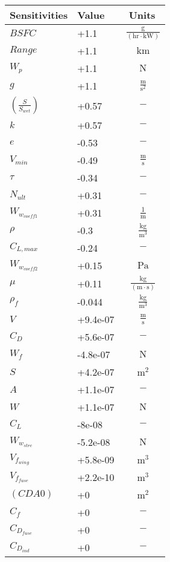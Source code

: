 {\footnotesize
\begin{longtable}{llc}
\toprule
Sensitivities & Value & Units \\ \midrule
$BSFC$ & +1.1  & $~\mathrm{\tfrac{g}{\left(hr\cdot kW\right)}}$ \\
$Range$ & +1.1  & $~\mathrm{km}$ \\
$W_p$ & +1.1  & $~\mathrm{N}$ \\
$g$ & +1.1  & $~\mathrm{\tfrac{m}{s^{2}}}$ \\
$(\frac{S}{S_{wet}})$ & +0.57  & $~\mathrm{-}$ \\
$k$ & +0.57  & $~\mathrm{-}$ \\
$e$ & -0.53  & $~\mathrm{-}$ \\
$V_{min}$ & -0.49  & $~\mathrm{\tfrac{m}{s}}$ \\
$\tau$ & -0.34  & $~\mathrm{-}$ \\
$N_{ult}$ & +0.31  & $~\mathrm{-}$ \\
$W_{w_{coeff1}}$ & +0.31  & $~\mathrm{\tfrac{1}{m}}$ \\
$\rho$ & -0.3  & $~\mathrm{\tfrac{kg}{m^{3}}}$ \\
$C_{L,max}$ & -0.24  & $~\mathrm{-}$ \\
$W_{w_{coeff2}}$ & +0.15  & $~\mathrm{Pa}$ \\
$\mu$ & +0.11  & $~\mathrm{\tfrac{kg}{\left(m\cdot s\right)}}$ \\
$\rho_f$ & -0.044  & $~\mathrm{\tfrac{kg}{m^{3}}}$ \\
$V$ & +9.4e-07  & $~\mathrm{\tfrac{m}{s}}$ \\
$C_D$ & +5.6e-07  & $~\mathrm{-}$ \\
$W_f$ & -4.8e-07  & $~\mathrm{N}$ \\
$S$ & +4.2e-07  & $~\mathrm{m^{2}}$ \\
$A$ & +1.1e-07  & $~\mathrm{-}$ \\
$W$ & +1.1e-07  & $~\mathrm{N}$ \\
$C_L$ & -8e-08  & $~\mathrm{-}$ \\
$W_{w_{strc}}$ & -5.2e-08  & $~\mathrm{N}$ \\
$V_{f_{wing}}$ & +5.8e-09  & $~\mathrm{m^{3}}$ \\
$V_{f_{fuse}}$ & +2.2e-10  & $~\mathrm{m^{3}}$ \\
$(CDA0)$ & +0  & $~\mathrm{m^{2}}$ \\
$C_f$ & +0  & $~\mathrm{-}$ \\
$C_{D_{fuse}}$ & +0  & $~\mathrm{-}$ \\
$C_{D_{ind}}$ & +0  & $~\mathrm{-}$ \\

\end{longtable}}
